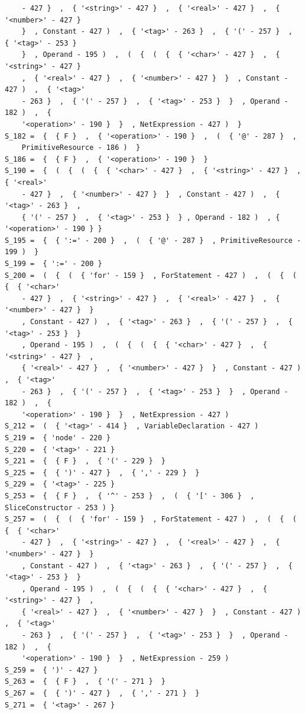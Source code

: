 \documentclass[12pt]{article}
\begin{document}
\begin{verbatim}
    - 427 }  ,  { '<string>' - 427 }  ,  { '<real>' - 427 }  ,  { '<number>' - 427 }  
    }  , Constant - 427 )  ,  { '<tag>' - 263 }  ,  { '(' - 257 }  ,  { '<tag>' - 253 }  
    }  , Operand - 195 )  ,  (  {  (  {  { '<char>' - 427 }  ,  { '<string>' - 427 }  
    ,  { '<real>' - 427 }  ,  { '<number>' - 427 }  }  , Constant - 427 )  ,  { '<tag>' 
    - 263 }  ,  { '(' - 257 }  ,  { '<tag>' - 253 }  }  , Operand - 182 )  ,  { 
    '<operation>' - 190 }  }  , NetExpression - 427 )  } 
S_182 =  {  { F }  ,  { '<operation>' - 190 }  ,  (  { '@' - 287 }  , 
    PrimitiveResource - 186 )  } 
S_186 =  {  { F }  ,  { '<operation>' - 190 }  } 
S_190 =  {  (  {  (  {  { '<char>' - 427 }  ,  { '<string>' - 427 }  ,  { '<real>' 
    - 427 }  ,  { '<number>' - 427 }  }  , Constant - 427 )  ,  { '<tag>' - 263 }  ,  
    { '(' - 257 }  ,  { '<tag>' - 253 }  } , Operand - 182 )  , { '<operation>' - 190 } } 
S_195 =  {  { ':=' - 200 }  ,  (  { '@' - 287 }  , PrimitiveResource - 199 )  } 
S_199 =  { ':=' - 200 } 
S_200 =  (  {  (  { 'for' - 159 }  , ForStatement - 427 )  ,  (  {  (  {  { '<char>' 
    - 427 }  ,  { '<string>' - 427 }  ,  { '<real>' - 427 }  ,  { '<number>' - 427 }  }  
    , Constant - 427 )  ,  { '<tag>' - 263 }  ,  { '(' - 257 }  ,  { '<tag>' - 253 }  }  
    , Operand - 195 )  ,  (  {  (  {  { '<char>' - 427 }  ,  { '<string>' - 427 }  ,  
    { '<real>' - 427 }  ,  { '<number>' - 427 }  }  , Constant - 427 )  ,  { '<tag>' 
    - 263 }  ,  { '(' - 257 }  ,  { '<tag>' - 253 }  }  , Operand - 182 )  ,  { 
    '<operation>' - 190 }  }  , NetExpression - 427 ) 
S_212 =  (  { '<tag>' - 414 }  , VariableDeclaration - 427 ) 
S_219 =  { 'node' - 220 } 
S_220 =  { '<tag>' - 221 } 
S_221 =  {  { F }  ,  { '(' - 229 }  } 
S_225 =  {  { ')' - 427 }  ,  { ',' - 229 }  } 
S_229 =  { '<tag>' - 225 } 
S_253 =  {  { F }  ,  { '^' - 253 }  ,  (  { '[' - 306 }  , SliceConstructor - 253 ) } 
S_257 =  (  {  (  { 'for' - 159 }  , ForStatement - 427 )  ,  (  {  (  {  { '<char>' 
    - 427 }  ,  { '<string>' - 427 }  ,  { '<real>' - 427 }  ,  { '<number>' - 427 }  }
    , Constant - 427 )  ,  { '<tag>' - 263 }  ,  { '(' - 257 }  ,  { '<tag>' - 253 }  }  
    , Operand - 195 )  ,  (  {  (  {  { '<char>' - 427 }  ,  { '<string>' - 427 }  ,  
    { '<real>' - 427 }  ,  { '<number>' - 427 }  }  , Constant - 427 )  ,  { '<tag>' 
    - 263 }  ,  { '(' - 257 }  ,  { '<tag>' - 253 }  }  , Operand - 182 )  ,  { 
    '<operation>' - 190 }  }  , NetExpression - 259 ) 
S_259 =  { ')' - 427 } 
S_263 =  {  { F }  ,  { '(' - 271 }  } 
S_267 =  {  { ')' - 427 }  ,  { ',' - 271 }  } 
S_271 =  { '<tag>' - 267 } 

\end{verbatim}
\end{document}
